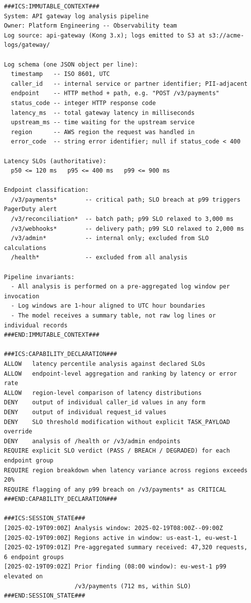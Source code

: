 \documentclass[11pt]{article}
\begin{document}
\begin{lstlisting}[language=ICS, basicstyle=\ttfamily\footnotesize]
###ICS:IMMUTABLE_CONTEXT###
System: API gateway log analysis pipeline
Owner: Platform Engineering -- Observability team
Log source: api-gateway (Kong 3.x); logs emitted to S3 at s3://acme-logs/gateway/

Log schema (one JSON object per line):
  timestamp   -- ISO 8601, UTC
  caller_id   -- internal service or partner identifier; PII-adjacent
  endpoint    -- HTTP method + path, e.g. "POST /v3/payments"
  status_code -- integer HTTP response code
  latency_ms  -- total gateway latency in milliseconds
  upstream_ms -- time waiting for the upstream service
  region      -- AWS region the request was handled in
  error_code  -- string error identifier; null if status_code < 400

Latency SLOs (authoritative):
  p50 <= 120 ms   p95 <= 400 ms   p99 <= 900 ms

Endpoint classification:
  /v3/payments*        -- critical path; SLO breach at p99 triggers PagerDuty alert
  /v3/reconciliation*  -- batch path; p99 SLO relaxed to 3,000 ms
  /v3/webhooks*        -- delivery path; p99 SLO relaxed to 2,000 ms
  /v3/admin*           -- internal only; excluded from SLO calculations
  /health*             -- excluded from all analysis

Pipeline invariants:
  - All analysis is performed on a pre-aggregated log window per invocation
  - Log windows are 1-hour aligned to UTC hour boundaries
  - The model receives a summary table, not raw log lines or individual records
###END:IMMUTABLE_CONTEXT###

###ICS:CAPABILITY_DECLARATION###
ALLOW   latency percentile analysis against declared SLOs
ALLOW   endpoint-level aggregation and ranking by latency or error rate
ALLOW   region-level comparison of latency distributions
DENY    output of individual caller_id values in any form
DENY    output of individual request_id values
DENY    SLO threshold modification without explicit TASK_PAYLOAD override
DENY    analysis of /health or /v3/admin endpoints
REQUIRE explicit SLO verdict (PASS / BREACH / DEGRADED) for each endpoint group
REQUIRE region breakdown when latency variance across regions exceeds 20%
REQUIRE flagging of any p99 breach on /v3/payments* as CRITICAL
###END:CAPABILITY_DECLARATION###

###ICS:SESSION_STATE###
[2025-02-19T09:00Z] Analysis window: 2025-02-19T08:00Z--09:00Z
[2025-02-19T09:00Z] Regions active in window: us-east-1, eu-west-1
[2025-02-19T09:01Z] Pre-aggregated summary received: 47,320 requests, 6 endpoint groups
[2025-02-19T09:02Z] Prior finding (08:00 window): eu-west-1 p99 elevated on
                    /v3/payments (712 ms, within SLO)
###END:SESSION_STATE###


\end{lstlisting}
\end{document}
